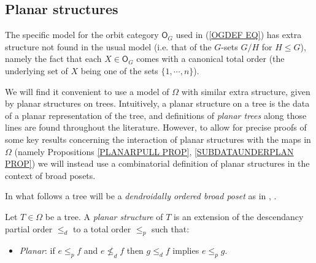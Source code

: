 \documentclass[a4paper,10pt]{article}%
\begin{document}
\subsection{Planar structures}\label{PLASTR SEC}



The specific model for the orbit category $\mathsf{O}_G$
used in (\ref{OGDEF EQ}) has extra structure not found in the usual model (i.e. that of the $G$-sets $G/H$ for $H \leq G$),
namely the fact that each $X \in \mathsf{O}_G$
comes with a canonical total order 
(the underlying set of $X$ being one of the sets $\{1,\cdots,n\}$).

We will find it convenient to use a model of $\Omega$ with similar extra structure, given by planar structures on trees.
Intuitively, a planar structure on a tree is the data of a planar representation of the tree, and 
definitions of \textit{planar trees} along those lines
are found throughout the literature.
However, to allow for precise proofs of some key results 
concerning the interaction of planar structures with the maps in $\Omega$ 
(namely Propositions \ref{PLANARPULL PROP},  \ref{SUBDATAUNDERPLAN PROP})
we will instead use a combinatorial definition 
of planar structures in the context of broad posets.

In what follows a tree will be a 
\textit{dendroidally ordered broad poset}
as in \cite{We12}, \cite[Def. 5.9]{Pe17}.


\begin{definition}\label{PLANARIZE DEF}
	Let $T \in \Omega$ be a tree. A \textit{planar structure} of $T$ is an extension of the descendancy partial order $\leq_d$ to a total order $\leq_p$ such that: 
	\begin{itemize}
		\item \textit{Planar}: if $e \leq_p f$ and $e \nleq_d f$ then 
		$g \leq_d f$ implies $e \leq_p g$.
	\end{itemize} 
\end{definition}
\end{document}
